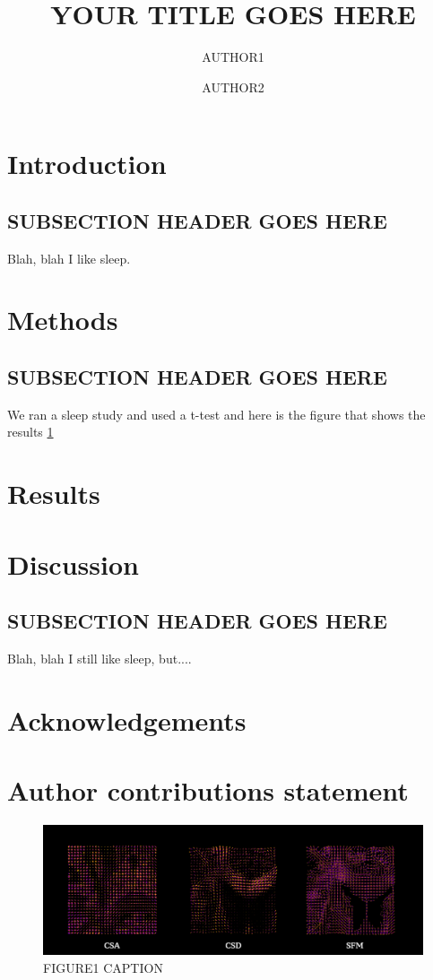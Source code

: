 \documentclass[fleqn,10pt]{wlscirep}
\title{YOUR TITLE GOES HERE}
\author[1,*]{AUTHOR1}
\author[1,*]{AUTHOR2}
\affil[*]{EMAIL}
\begin{document}
\maketitle

\section*{Introduction}
\subsection{SUBSECTION HEADER GOES HERE}
Blah, blah I like sleep.

\section*{Methods}
\subsection{SUBSECTION HEADER GOES HERE}
We ran a sleep study and used a t-test \cite{students_t_1908} and here is the figure that shows the results \ref{fig:FIGURE1_LABEL}

\section*{Results}


\section*{Discussion}
\subsection{SUBSECTION HEADER GOES HERE}
Blah, blah I still like sleep, but....

\printbibliography{}

\section*{Acknowledgements}

\section*{Author contributions statement}

\begin{figure}
\centering
\includegraphics[width=\linewidth, angle=0, scale=1.0, keepaspectratio=true]{figures/SAMPLE_FIGURE_1.png}
\caption{FIGURE1 CAPTION}
\label{fig:FIGURE1_LABEL}
\end{figure}
\end{document}

